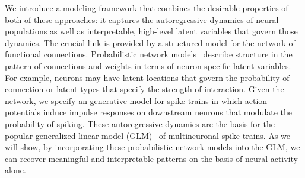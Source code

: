 We introduce a modeling framework that combines the desirable 
properties of both of these approaches: it captures the autoregressive 
dynamics of neural populations as well as interpretable, high-level 
latent variables that govern those dynamics. The crucial link is 
provided by a structured model for the network of functional 
connections. Probabilistic network models~\cite{Hoff-2002}
describe structure in the pattern of connections and weights in 
terms of neuron-specific latent variables. For example, 
neurons may have latent locations that govern the probability of 
connection or latent types that specify the strength of interaction.
Given the network, we specify an generative model for spike 
trains in which action potentials induce impulse responses on 
downstream neurons that modulate the probability of spiking. 
These autoregressive dynamics are the basis for the popular 
generalized linear model (GLM)~\cite{Truccolo-2005, Paninski-2004, Pillow-2008}
of multineuronal spike trains. 
As we will show, by incorporating these probabilistic network models 
into the GLM, we can recover meaningful 
and interpretable patterns on the basis of neural activity alone.


